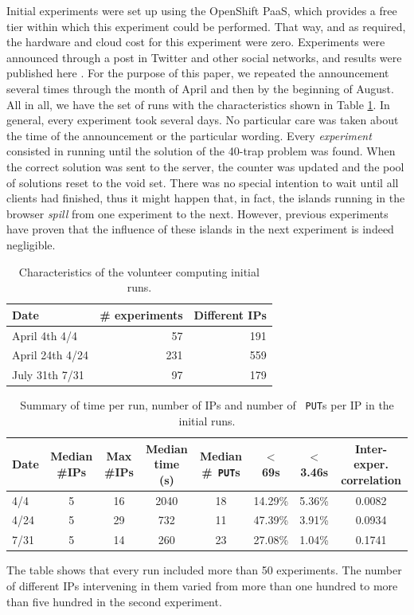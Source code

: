 \documentclass[letterpaper]{article}
\begin{document}
Initial experiments were set up using the OpenShift
PaaS, which provides a free tier within which this 
experiment could be performed. That way, and as required, the hardware
and cloud cost for this experiment were zero. Experiments were
announced through a post in Twitter and other social networks, and
results were published here \citep{DBLP:conf/gecco/GuervosG15}. For the
purpose of this paper, we repeated the announcement several times
through the month of April and then by the beginning of August. All
in all, we have the set of runs with the characteristics shown in
Table \ref{tab:runs}. In general, every experiment took several
days. No particular care was taken about the time of the announcement
or the particular wording. Every {\em experiment} consisted in running
until the solution of the 40-trap problem was found. When the correct
solution was sent to the server, the counter was updated and the pool
of solutions reset to the void set. There was no special intention to wait
until all clients had finished, thus it might happen that, in fact,
the islands running in the browser {\em spill} from one experiment to
the next. However, previous experiments have proven that the influence
of these islands in the next experiment is indeed negligible.
%
\begin{table}
\caption{Characteristics of the volunteer computing initial runs. \label{tab:runs}}
\begin{center}
\begin{tabular}{l|rr}
\hline
Date & \# experiments & Different IPs \\
\hline
April 4th 4/4 & 57 & 191 \\
April 24th 4/24 &  231 & 559 \\
July 31th 7/31 & 97 & 179 \\
\hline
\end{tabular}
\end{center}
\end{table}
%
\begin{table}
\caption{Summary of time per run, number of IPs and number of {\tt
    PUT}s per IP in the initial runs. \label{tab:summary:os}}
\begin{center}
\begin{tabular}{l|ccccccc}
\hline
Date & Median \#IPs & Max \#IPs & Median time (s) & Median \#{\tt
  PUT}s & $<$ 69s & $<$ 3.46s & Inter-exper. correlation\\
\hline
4/4 & 5 & 16 & 2040 & 18 & 14.29\% & 5.36\% & 0.0082 \\
4/24 &  5 & 29 & 732 & 11 & 47.39\% & 3.91\% & 0.0934\\
7/31 & 5 & 14 & 260 & 23 & 27.08\% & 1.04\%  & 0.1741\\
\hline
\end{tabular}
\end{center}
\end{table}
%
The table shows that every run included more than 50 experiments. The
number of different IPs intervening in them varied from more than one
hundred to more than five hundred in the second experiment.
\end{document}

